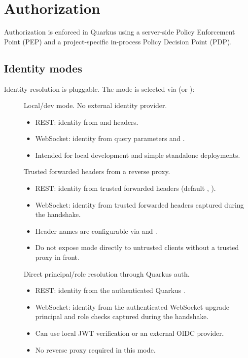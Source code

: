 \section{Authorization}
\label{sec:Authorization}

Authorization is enforced in Quarkus using a server-side Policy Enforcement
Point (PEP) and a project-specific in-process Policy Decision Point (PDP).

\subsection{Identity modes}

Identity resolution is pluggable. The mode is selected via
 (or ):

\begin{description}
\item[] Local/dev mode. No external identity provider.
  \begin{itemize}
  \item REST: identity from  and
     headers.
  \item WebSocket: identity from query parameters  and
    .
  \item Intended for local development and simple standalone deployments.
  \end{itemize}

\item[] Trusted forwarded headers from a reverse proxy.
  \begin{itemize}
  \item REST: identity from trusted forwarded headers (default
    , ).
  \item WebSocket: identity from trusted forwarded headers captured during
    the handshake.
  \item Header names are configurable via
     and
    .
  \item Do not expose  mode directly to untrusted clients
    without a trusted proxy in front.
  \end{itemize}

\item[] Direct principal/role resolution through Quarkus auth.
  \begin{itemize}
  \item REST: identity from the authenticated Quarkus
    .
  \item WebSocket: identity from the authenticated WebSocket upgrade
    principal and role checks captured during the handshake.
  \item Can use local JWT verification or an external OIDC provider.
  \item No reverse proxy required in this mode.
  \end{itemize}
\end{description}

